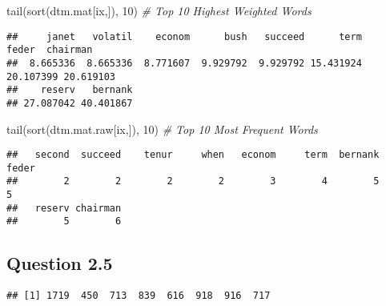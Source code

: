 \documentclass[
]{article}
\newenvironment{Shaded}{\begin{snugshade}}{\end{snugshade}}
\newcommand{\CommentTok}[1]{\textcolor[rgb]{0.56,0.35,0.01}{\textit{#1}}}
\newcommand{\DecValTok}[1]{\textcolor[rgb]{0.00,0.00,0.81}{#1}}
\newcommand{\FunctionTok}[1]{\textcolor[rgb]{0.00,0.00,0.00}{#1}}
\newcommand{\NormalTok}[1]{#1}
\newcommand{\OtherTok}[1]{\textcolor[rgb]{0.56,0.35,0.01}{#1}}
\newcommand{\SpecialCharTok}[1]{\textcolor[rgb]{0.00,0.00,0.00}{#1}}
\begin{document}
\begin{Shaded}
\begin{Highlighting}[]
\FunctionTok{tail}\NormalTok{(}\FunctionTok{sort}\NormalTok{(dtm.mat[ix,]), }\DecValTok{10}\NormalTok{) }\CommentTok{\# Top 10 Highest Weighted Words}
\end{Highlighting}
\end{Shaded}

\begin{verbatim}
##     janet   volatil    econom      bush   succeed      term     feder  chairman 
##  8.665336  8.665336  8.771607  9.929792  9.929792 15.431924 20.107399 20.619103 
##    reserv   bernank 
## 27.087042 40.401867
\end{verbatim}

\begin{Shaded}
\begin{Highlighting}[]
\FunctionTok{tail}\NormalTok{(}\FunctionTok{sort}\NormalTok{(dtm.mat.raw[ix,]), }\DecValTok{10}\NormalTok{) }\CommentTok{\# Top 10 Most Frequent Words}
\end{Highlighting}
\end{Shaded}

\begin{verbatim}
##   second  succeed    tenur     when   econom     term  bernank    feder 
##        2        2        2        2        3        4        5        5 
##   reserv chairman 
##        5        6
\end{verbatim}

\hypertarget{question-2.5}{%
\subsection{Question 2.5}\label{question-2.5}}

\begin{Shaded}
\end{Shaded}

\begin{verbatim}
## [1] 1719  450  713  839  616  918  916  717
\end{verbatim}
\end{document}
